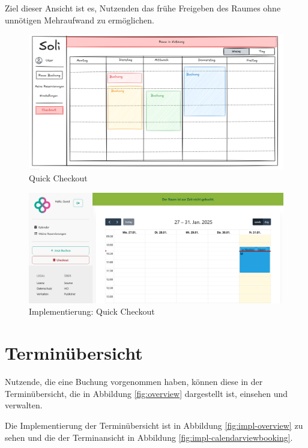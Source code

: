 Ziel dieser Ansicht ist es, Nutzenden das frühe Freigeben des Raumes ohne unnötigen Mehraufwand zu ermöglichen.
\begin{figure}[ht]
    \centering
    \includegraphics[width=\textwidth]{figures/mockup/calendar_checkout}
    \caption{Quick Checkout}
    \label{fig:checkout}
\end{figure}
\clearpage

\begin{figure}[ht]
    \centering
    \includegraphics[width=\textwidth]{figures/impl-views/calendar_checkout}
    \caption{Implementierung: Quick Checkout}
    \label{fig:impl-checkout}
\end{figure}
\clearpage


\section{Terminübersicht}
Nutzende, die eine Buchung vorgenommen haben, können diese in der Terminübersicht,
die in Abbildung \ref{fig:overview} dargestellt ist, einsehen und verwalten.

Die Implementierung der Terminübersicht ist in Abbildung \ref{fig:impl-overview} zu sehen und die der Terminansicht in Abbildung \ref{fig:impl-calendarviewbooking}.

